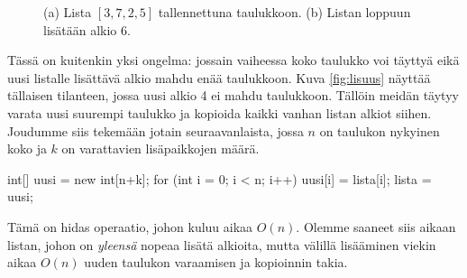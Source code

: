 \begin{figure}
\center
{}
\caption{(a) Lista $[3,7,2,5]$ tallennettuna taulukkoon. (b) Listan loppuun lisätään alkio 6.}
\label{fig:listau}
\end{figure}

Tässä on kuitenkin yksi ongelma: jossain vaiheessa koko taulukko
voi täyttyä eikä uusi listalle lisättävä alkio mahdu enää taulukkoon.
Kuva \ref{fig:lisuus} näyttää tällaisen tilanteen,
jossa uusi alkio 4 ei mahdu taulukkoon.
Tällöin meidän täytyy varata uusi suurempi taulukko ja
kopioida kaikki vanhan listan alkiot siihen.
Joudumme siis tekemään jotain seuraavanlaista,
jossa $n$ on taulukon nykyinen koko ja $k$ on varattavien
lisäpaikkojen määrä.

\begin{code}
int[] uusi = new int[n+k];
for (int i = 0; i < n; i++) {
    uusi[i] = lista[i];
}
lista = uusi;
\end{code}

Tämä on hidas operaatio, johon kuluu aikaa $O(n)$.
Olemme saaneet siis aikaan listan, johon on \emph{yleensä} nopeaa lisätä
alkioita, mutta välillä lisääminen viekin aikaa $O(n)$
uuden taulukon varaamisen ja kopioinnin takia.

